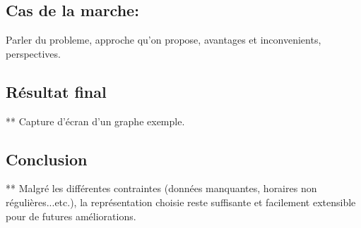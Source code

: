 \subsection{Cas de la marche:}
Parler du probleme, approche qu'on propose, avantages et inconvenients, perspectives.
\subsection{Résultat final}
	** Capture d'écran d'un graphe exemple.

\subsection{Conclusion}

** Malgré les différentes contraintes (données manquantes, horaires non régulières...etc.), la représentation choisie reste suffisante et facilement extensible pour de futures améliorations.
\newpage
